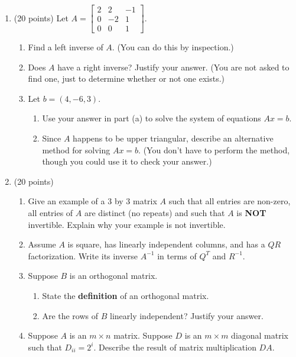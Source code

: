 \documentclass[11pt,fleqn]{article}
\def\vecthree#1#2#3{\begin{bmatrix}#1\\#2\\#3\end{bmatrix}}
\begin{document}
\begin{enumerate}
\begin{enumerate}
	\vspace{3in}
	\end{enumerate}
\newpage
\item (20 points) Let $A=\begin{bmatrix} 2&2&-1\\0&-2&1\\0&0&1\end{bmatrix}.$
	\begin{enumerate}
	\item Find a left inverse of $A.$ (You can do this by inspection.)
	\vfill
	\item Does $A$ have a right inverse? Justify your answer. (You are not asked to find one, just to determine whether or not one exists.)
	\vspace{1in}
	\item Let $b=(4,-6,3).$
		\begin{enumerate} 
		\item Use your answer in part (a) to solve the system of equations $Ax=b.$
		\vfill
		\item Since $A$ happens to be upper triangular, describe an alternative method for solving $Ax=b.$ (You don't have to perform the method, though you could use it to check your answer.)
		\vspace{1in}
		\end{enumerate}
		
	\end{enumerate}
\newpage
\item (20 points) 
	\begin{enumerate}
	\item Give an example of a 3 by 3 matrix $A$ such that all entries are non-zero, all entries of $A$ are distinct (no repeats) and such that $A$ is \textbf{NOT} invertible. Explain why your example is not invertible.
	\vfill
	\item Assume $A$ is square, has linearly independent columns, and has a $QR$ factorization. Write its inverse $A^{-1}$ in terms of $Q^T$ and $R^{-1}$. 	\vfill
	\item Suppose $B$ is an orthogonal matrix.
		\begin{enumerate}
		\item State the \textbf{definition} of an orthogonal matrix.
		\vspace{1in}
		\item Are the rows of $B$ linearly independent? Justify your answer.
		\vfill
		\end{enumerate}
	\item Suppose $A$ is an $m \times n$ matrix. Suppose $D$ is an $m \times m$ diagonal matrix such that $D_{ii}=2^i.$ Describe the result of matrix multiplication $DA.$
	\vfill
	\end{enumerate} 
\end{enumerate}
\end{document}
